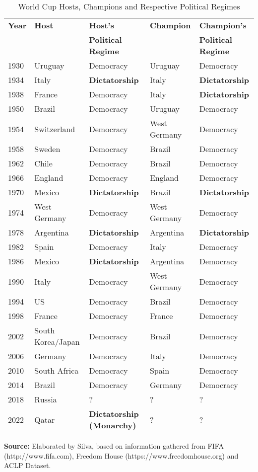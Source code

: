 \documentclass[12pt,a4paper]{article}
\begin{document}
\begin{table}[htbp]
\footnotesize
\centering
\caption{World Cup Hosts, Champions and Respective Political Regimes\label{worldcup}}
	\begin{tabular}{lllll}\hline\hline
		\textbf{Year} & \textbf{Host} & \textbf{Host's} & \textbf{Champion} & \textbf{Champion's} \\ 
		\textbf{} & \textbf{} & \textbf{Political Regime} & \textbf{} & \textbf{Political Regime} \\ 
		\hline
		1930 & Uruguay & Democracy & Uruguay & Democracy \\ 
		1934 & Italy & \textbf{Dictatorship} & Italy & \textbf{Dictatorship} \\ 
		1938 & France & Democracy & Italy & \textbf{Dictatorship} \\ 
		1950 & Brazil & Democracy & Uruguay & Democracy \\ 
		1954 & Switzerland & Democracy & West Germany & Democracy \\ 
		1958 & Sweden & Democracy & Brazil & Democracy \\ 
		1962 & Chile & Democracy & Brazil & Democracy \\ 
		1966 & England & Democracy & England & Democracy \\ 
		1970 & Mexico & \textbf{Dictatorship} & Brazil & \textbf{Dictatorship} \\ 
		1974 & West Germany & Democracy & West Germany & Democracy \\ 
		1978 & Argentina & \textbf{Dictatorship} & Argentina & \textbf{Dictatorship} \\ 
		1982 & Spain & Democracy & Italy & Democracy \\ 
		1986 & Mexico & \textbf{Dictatorship} & Argentina & Democracy \\ 
		1990 & Italy & Democracy & West Germany & Democracy \\ 
		1994 & US & Democracy & Brazil & Democracy \\
		1998 & France & Democracy & France & Democracy \\ 
		2002 & South Korea/Japan & Democracy & Brazil & Democracy \\ 
		2006 & Germany & Democracy & Italy & Democracy \\ 
		2010 & South Africa & Democracy & Spain & Democracy \\ 
		2014 & Brazil & Democracy & Germany & Democracy \\ 
		2018 & Russia & ? & ? & ? \\ 
		2022 & Qatar & \textbf{Dictatorship (Monarchy)} & ? & ? \\                                 
\hline
\end{tabular}
\begin{flushleft} 
\scriptsize\textbf{Source:} {Elaborated by Silva, based on information gathered from FIFA (http://www.fifa.com), Freedom House (https://www.freedomhouse.org) and ACLP Dataset.}
\end{flushleft}
\end{table}	
	
\end{document}
